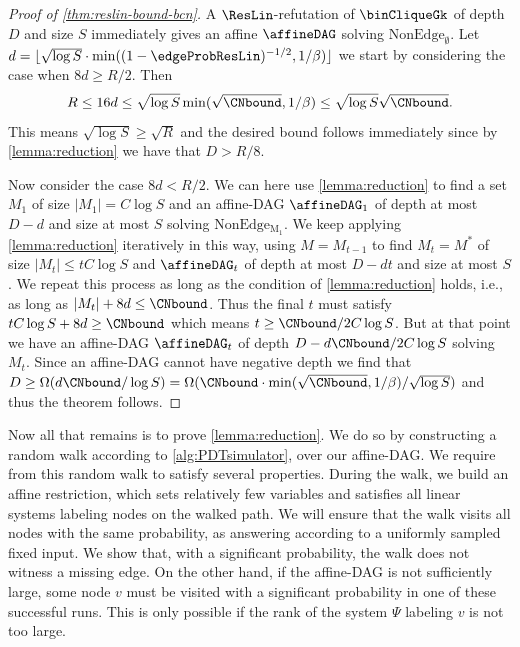 \begin{proof}[Proof of \autoref{thm:reslin-bound-bcn}]
A $\ResLin$-refutation of $\binCliqueGk$ of depth $D$ and size $S$ immediately gives an affine $\affineDAG$ solving $\mathrm{NonEdge}_\emptyset$. Let $d=\lfloor \sqrt{\log S} \cdot \min((1-\edgeProbResLin)^{-1/2},1/\beta)\rfloor$ we start by considering the case when $8d\geq R/2$. Then \begin{equation*}
    R\leq 16d \leq \sqrt{\log S} \min(\sqrt \CNbound,1/\beta)\leq \sqrt{\log S}\sqrt{\CNbound}. 
\end{equation*}
This means $\sqrt{\log S} \geq \sqrt{R}$ and the desired bound follows immediately since by
\autoref{lemma:reduction} we have that $D > R/8$.

Now consider the case $8d<R/2$. We can here use \autoref{lemma:reduction} to find a set $M_1$ of size $|M_1|=C\log S$ and an affine-DAG $\affineDAG_1$ of depth at most $D-d$ and size at most $S$ solving $\mathrm{NonEdge_{M_1}}$. 
We keep applying \autoref{lemma:reduction} iteratively in this way, using $M=M_{t-1}$ to find $M_{t} = M^*$ of size $|M_t|\leq tC\log S$ and $\affineDAG_t$ of depth at most $D-dt$ and size at most $S$. We repeat this process as long as the condition of \autoref{lemma:reduction} holds, i.e., as long as $|M_t|+ 8d \leq \CNbound$. 
Thus the final $t$ must satisfy $tC\log S +8d \geq \CNbound$ which means $t \geq \CNbound/2C\log S$. But at that point we have an affine-DAG $\affineDAG_t$ of depth $D-d\CNbound/2C\log S$ solving $M_t$.
Since an affine-DAG cannot have negative depth we find that $D \geq \Omega(d\CNbound/\log S) = \Omega(\CNbound \cdot \min(\sqrt{\CNbound},1/\beta)/\sqrt{\log S})$ and thus the theorem follows.
\end{proof}

Now all that remains is to prove \autoref{lemma:reduction}. We do so by constructing a random walk according to \autoref{alg:PDTsimulator}, over our affine-DAG. We require from this random walk to satisfy several properties. During the walk, we build an affine restriction, which sets relatively few variables and satisfies all linear systems labeling nodes on the walked path. 
We will ensure that the walk visits all nodes with the same probability, as answering according to a uniformly sampled fixed input.
We show that, with a significant probability, the walk does not witness a missing edge. On the other hand, if the affine-DAG is not sufficiently large, some node $v$ must be visited with a significant probability in one of these successful runs. This is only possible if the rank of the system $\Psi$ labeling $v$ is not too large. 

